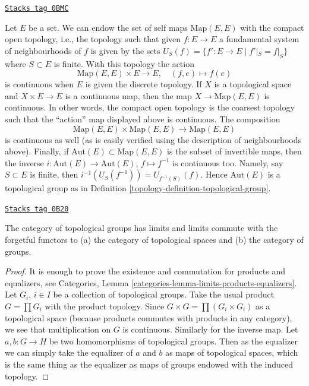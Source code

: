 \begin{example}
\label{topology-example-automorphisms-of-a-set}
\href{https://stacks.math.columbia.edu/tag/0BMC}{\texttt{Stacks tag 0BMC}}

Let $E$ be a set. We can endow the set of self maps $\text{Map}(E, E)$
with the compact open topology, i.e., the topology such that given
$f : E \to E$ a fundamental system of neighbourhoods of $f$ is given
by the sets $U_S(f) = \{f' : E \to E \mid f'|_S = f|_S\}$ where
$S \subset E$ is finite. With this topology the action
$$
\text{Map}(E, E) \times E \longrightarrow E,\quad
(f, e) \longmapsto f(e)
$$
is continuous when $E$ is given the discrete topology. If $X$
is a topological space and $X \times E \to E$ is a continuous map,
then the map $X \to \text{Map}(E, E)$ is continuous. In other
words, the compact open topology is the coarsest topology
such that the ``action'' map displayed above is continuous. The composition
$$
\text{Map}(E, E) \times \text{Map}(E, E) \to \text{Map}(E, E)
$$
is continuous as well (as is easily verified using the description
of neighbourhoods above). Finally, if $\text{Aut}(E) \subset \text{Map}(E, E)$
is the subset of invertible maps, then the inverse
$i : \text{Aut}(E) \to \text{Aut}(E)$, $f \mapsto f^{-1}$ is
continuous too. Namely, say $S \subset E$ is finite, then
$i^{-1}(U_S(f^{-1})) = U_{f^{-1}(S)}(f)$. Hence
$\text{Aut}(E)$ is a topological group as in
Definition \ref{topology-definition-topological-group}.
\end{example}

\begin{lemma}
\label{topology-lemma-topological-group-limits}
\href{https://stacks.math.columbia.edu/tag/0B20}{\texttt{Stacks tag 0B20}}

The category of topological groups has limits and limits commute
with the forgetful functors to (a) the category of topological spaces and
(b) the category of groups.
\end{lemma}

\begin{proof}
It is enough to prove the existence and commutation for products and
equalizers, see
Categories, Lemma \ref{categories-lemma-limits-products-equalizers}.
Let $G_i$, $i \in I$ be a collection of topological groups.
Take the usual product $G = \prod G_i$ with the product topology.
Since $G \times G = \prod (G_i \times G_i)$ as a topological space
(because products commutes with products in any category), we
see that multiplication on $G$ is continuous. Similarly for
the inverse map. Let $a, b : G \to H$ be two homomorphisms of
topological groups. Then as the equalizer we can simply take
the equalizer of $a$ and $b$ as maps of topological spaces,
which is the same thing as the equalizer as maps of groups
endowed with the induced topology.
\end{proof}

